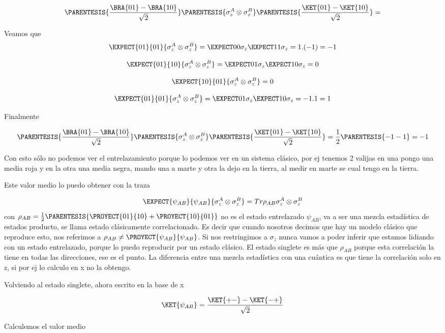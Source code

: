 \[
\PARENTESIS{\frac{\BRA{01}-\BRA{10}}{\sqrt{2}}}\PARENTESIS{\sigma_{z}^{A}\otimes\sigma_{z}^{B}}\PARENTESIS{\frac{\KET{01}-\KET{10}}{\sqrt{2}}}=
\]

Veamos que 
\[
\EXPECT{01}{01}{\sigma_{z}^{A}\otimes\sigma_{z}^{B}}=\EXPECT 00{\sigma_{z}}\EXPECT 11{\sigma_{z}}=1.(-1)=-1
\]

\[
\EXPECT{01}{10}{\sigma_{z}^{A}\otimes\sigma_{z}^{B}}=\EXPECT 01{\sigma_{z}}\EXPECT 10{\sigma_{z}}=0
\]

\[
\EXPECT{10}{01}{\sigma_{z}^{A}\otimes\sigma_{z}^{B}}=0
\]

\[
\EXPECT{01}{01}{\sigma_{z}^{A}\otimes\sigma_{z}^{B}}=\EXPECT 01{\sigma_{z}}\EXPECT 10{\sigma_{z}}=-1.1=1
\]

Finalmente 

\[
\PARENTESIS{\frac{\BRA{01}-\BRA{10}}{\sqrt{2}}}\PARENTESIS{\sigma_{z}^{A}\otimes\sigma_{z}^{B}}\PARENTESIS{\frac{\KET{01}-\KET{10}}{\sqrt{2}}}=\frac{1}{2}\PARENTESIS{-1-1}=-1
\]

Con esto sólo no podemos ver el entrelazamiento porque lo podemos
ver en un sistema clásico, por ej tenemos 2 valijas en una pongo una
media roja y en la otra una media negra, mando una a marte y otra
la dejo en la tierra, al medir en marte se cual tengo en la tierra. 

Este valor medio lo puedo obtener con la traza

\[
\EXPECT{\psi_{AB}}{\psi_{AB}}{\sigma_{z}^{A}\otimes\sigma_{z}^{B}}=Tr\rho_{AB}\sigma_{z}^{A}\otimes\sigma_{z}^{B}
\]
 con $\rho_{AB}=\frac{1}{2}\PARENTESIS{\PROYECT{01}{10}+\PROYECT{10}{01}}$
no es el estado entrelazado $\psi_{AB}$, va a ser una mezcla estadística
de estados producto, se llama estado clásicamente correlacionado.
Es decir que cuando nosotros decimos que hay un modelo clásico que
reproduce esto, nos referimos a $\rho_{AB}\neq\PROYECT{\psi_{AB}}{\psi_{AB}}$.
Si nos restringimos a $\sigma_{z}$ nunca vamos a poder inferir que
estamos lidiando con un estado entrelazado, porque lo puedo reproducir
por un estado clásico. El estado singlete es más que $\rho_{AB}$
porque esta correlación la tiene en todas las direcciones, ese es
el punto. La diferencia entre una mezcla estadística con una cuántica
es que tiene la correlación solo en z, si por ej lo calculo en x no
la obtengo.

Volviendo al estado singlete, ahora escrito en la base de x

\[
\KET{\psi_{AB}}=\frac{\KET{+-}-\KET{-+}}{\sqrt{2}}
\]

Calculemos el valor medio

